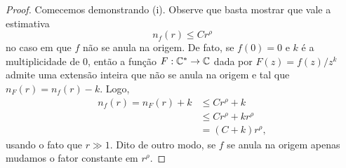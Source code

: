     \begin{proof}
       Comecemos demonstrando (i). Observe que basta mostrar que vale a estimativa
       \begin{equation*}
           n_f(r) \leq Cr^{\rho}
       \end{equation*}
       no caso em que $f$ não se anula na origem. De fato, se $f(0) = 0$ e $k$
       é a multiplicidade de $0$, então a função $F:\mathbb{C}^*\to\mathbb{C}$ dada por 
       $F(z) = f(z)/z^k$ admite uma extensão inteira que não se anula na origem
       e tal que $n_F(r) = n_f(r) - k$. Logo,
       \begin{align*}
           n_f(r) = n_F(r) + k &\leq Cr^{\rho} + k \\
                               &\leq Cr^{\rho} + kr^{\rho} \\
                               &= (C+k) r^{\rho},
       \end{align*}
       usando o fato que $r\gg 1$. Dito de outro modo, se $f$ se anula na origem
       apenas mudamos o fator constante em $r^{\rho}$.
       

\end{proof}
